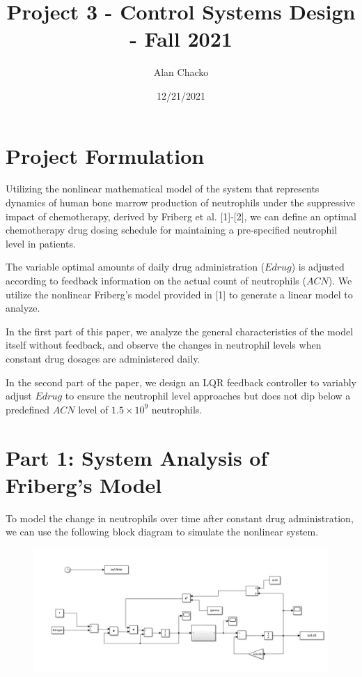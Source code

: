 \documentclass[11pt]{article}
\title{Project 3 - Control Systems Design - Fall 2021}
\author{Alan Chacko}
\date{12/21/2021}
\begin{document}
\maketitle

\section*{Project Formulation}

Utilizing the nonlinear mathematical model of the system that represents dynamics of human bone marrow production of neutrophils under the suppressive impact of chemotherapy, derived by Friberg et al. [1]-[2], we can define an optimal chemotherapy drug dosing schedule for maintaining a pre-specified neutrophil level in patients.

The variable optimal amounts of daily drug administration ($Edrug$) is adjusted according to feedback information on the actual count of neutrophils ($ACN$). We utilize the nonlinear Friberg's model provided in [1] to generate a linear model to analyze. 

In the first part of this paper, we analyze the general characteristics of the model itself without feedback, and observe the changes in neutrophil levels when constant drug dosages are administered daily.

In the second part of the paper, we design an LQR feedback controller to variably adjust $Edrug$ to ensure the neutrophil level approaches but does not dip below a predefined $ACN$ level of $1.5\times 10^9$ neutrophils.

\section*{Part 1: System Analysis of Friberg's Model}

To model the change in neutrophils over time after constant drug administration, we can use the following block diagram to simulate the nonlinear system.

\begin{figure}[H]
    \includegraphics[width=\textwidth]{p1blockdiagram.jpg}
\end{figure}
\end{document}
